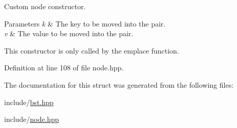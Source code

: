 Custom node constructor. 


\begin{DoxyParams}{Parameters}
{\em k} & The key to be moved into the pair. \\
\hline
{\em v} & The value to be moved into the pair.\\
\hline
\end{DoxyParams}
This constructor is only called by the emplace function. 

Definition at line 108 of file node.\+hpp.



The documentation for this struct was generated from the following files\+:\begin{DoxyCompactItemize}
\item 
include/\hyperlink{bst_8hpp}{bst.\+hpp}\item 
include/\hyperlink{node_8hpp}{node.\+hpp}\end{DoxyCompactItemize}
